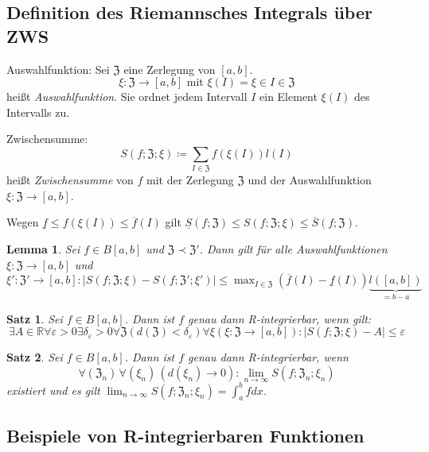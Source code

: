 \documentclass[ngerman,titlepage,twoside, parskip=half*]{scrreprt}
\newcommand*{\R}{\mathbb{R}}
\newcommand*{\ZZ}{\mathfrak{Z}}
\theoremstyle{plain}
\newtheorem{lemma}{Lemma}
\newtheorem{theorem}{Satz}[section]
\theoremstyle{definition}
\theoremstyle{remark}
\begin{document}
\subsection{Definition des Riemannsches Integrals über ZWS}

Auswahlfunktion: Sei $\ZZ$ eine Zerlegung von $[a,b]$.
\[\xi\colon\ZZ\rightarrow[a,b] \text{ mit } \xi(I)=\xi\in I\in\ZZ\]
heißt \emph{Auswahlfunktion}. Sie ordnet jedem
Intervall $I$ ein Element $\xi(I)$ des Intervalls zu.

Zwischensumme:
\[S(f;\ZZ;\xi)\coloneqq\sum_{I\in\ZZ} f(\xi(I)) l(I)\]
heißt \emph{Zwischensumme} von $f$ mit der Zerlegung
$\ZZ$ und der Auswahlfunktion $\xi\colon\ZZ\rightarrow[a,b]$.

Wegen $\underline{f}\leq f(\xi(I))\leq\overline{f}(I)$ gilt $\underline{S}
(f;\ZZ)\leq S(f;\ZZ;\xi)\leq\overline{S}(f;\ZZ)$.

\begin{lemma}
  Sei $f\in B[a,b]$ und $\ZZ\prec\ZZ'$. Dann gilt für alle Auswahlfunktionen
  $\xi\colon\ZZ\rightarrow[a,b]$ und $\xi'\colon\ZZ'\rightarrow [a,b]\colon |S(f;\ZZ;\xi)
  -S(f;\ZZ';\xi')|\leq\max_{I\in\ZZ} (\overline{f}(I)-\underline{f}(I))
  \underbrace{l([a,b])}_{=b-a}$
\end{lemma}

\begin{theorem}
  Sei $f\in B[a,b]$. Dann ist $f$ genau dann R-integrierbar, wenn gilt:
  \[\exists A\in\R \forall\varepsilon>0 \exists\delta_\varepsilon>0
  \forall\ZZ(d(\ZZ)<\delta_\varepsilon) \forall \xi(\xi\colon\ZZ\rightarrow
  [a,b])\colon|S(f;\ZZ;\xi)-A|\leq \varepsilon\]
\end{theorem}

\begin{theorem}
  Sei $f\in B[a,b]$. Dann ist $f$ genau dann R-integrierbar, wenn
  \[\forall (\ZZ_n)\,\forall (\xi_n)\,(d(\xi_n)\rightarrow 0)\colon
  \lim_{n\rightarrow\infty} S(f;\ZZ_n;\xi_n)\]
  existiert und es gilt $\lim_{n\rightarrow\infty} S(f;\ZZ_n;\xi_n)=\int_a^b
  fdx$.
\end{theorem}

\subsection{Beispiele von R-integrierbaren Funktionen}
\end{document}
